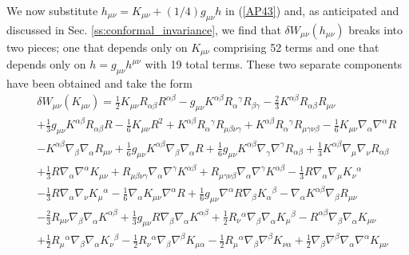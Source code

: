 We now substitute $h_{\mu\nu}=K_{\mu\nu}+(1/4)g_{\mu\nu}h$ in (\ref{AP43}) and, as anticipated and discussed in Sec. \ref{ss:conformal_invariance}, we find that $\delta W_{\mu\nu}(h_{\mu\nu})$ breaks into two pieces; one that depends only on $K_{\mu\nu}$ comprising 52 terms and one that depends only on $h=g_{\mu\nu}h^{\mu\nu}$ with 19 total terms. These two separate components have been obtained and take the form
%
\begin{eqnarray}
&&\delta W_{\mu\nu}(K_{\mu\nu})=\tfrac{1}{2} K_{\mu \nu} R_{\alpha \beta} R^{\alpha \beta} -  g_{\mu \nu} K^{\alpha \beta} R_{\alpha}{}^{\gamma} R_{\beta \gamma} -  \tfrac{2}{3} K^{\alpha \beta} R_{\alpha \beta} R_{\mu \nu} 
\nonumber\\
&&+ \tfrac{1}{3} g_{\mu \nu} K^{\alpha \beta} R_{\alpha \beta} R -  \tfrac{1}{6} K_{\mu \nu} R^2 
+ K^{\alpha \beta} R_{\alpha}{}^{\gamma} R_{\mu \beta \nu \gamma} 
+ K^{\alpha \beta} R_{\alpha}{}^{\gamma} R_{\mu \gamma \nu \beta} -  \tfrac{1}{6} K_{\mu \nu} \nabla_{\alpha}\nabla^{\alpha}R 
\nonumber\\
&&-  K^{\alpha \beta} \nabla_{\beta}\nabla_{\alpha}R_{\mu \nu} + \tfrac{1}{6} g_{\mu \nu} K^{\alpha \beta} \nabla_{\beta}\nabla_{\alpha}R + \tfrac{1}{6} g_{\mu \nu} K^{\alpha \beta} \nabla_{\gamma}\nabla^{\gamma}R_{\alpha \beta} 
+ \tfrac{1}{3} K^{\alpha \beta} \nabla_{\mu}\nabla_{\nu}R_{\alpha \beta}
\nonumber\\
&&
+\tfrac{1}{3} R \nabla_{\alpha}\nabla^{\alpha}K_{\mu \nu} + R_{\mu \beta \nu \gamma} \nabla_{\alpha}\nabla^{\gamma}K^{\alpha \beta} + R_{\mu \gamma \nu \beta} \nabla_{\alpha}\nabla^{\gamma}K^{\alpha \beta} -  \tfrac{1}{3} R \nabla_{\alpha}\nabla_{\mu}K_{\nu}{}^{\alpha} 
\nonumber\\
&&-  \tfrac{1}{3} R \nabla_{\alpha}\nabla_{\nu}K_{\mu}{}^{\alpha} 
-  \tfrac{1}{6} \nabla_{\alpha}K_{\mu \nu} \nabla^{\alpha}R 
+ \tfrac{1}{6} g_{\mu \nu} \nabla^{\alpha}R \nabla_{\beta}K_{\alpha}{}^{\beta} -  \nabla_{\alpha}K^{\alpha \beta} \nabla_{\beta}R_{\mu \nu} 
\nonumber\\
&&-  \tfrac{2}{3} R_{\mu \nu} \nabla_{\beta}\nabla_{\alpha}K^{\alpha \beta} + \tfrac{1}{3} g_{\mu \nu} R \nabla_{\beta}\nabla_{\alpha}K^{\alpha \beta} + \tfrac{1}{2} R_{\nu}{}^{\alpha} \nabla_{\beta}\nabla_{\alpha}K_{\mu}{}^{\beta} 
-  R^{\alpha \beta} \nabla_{\beta}\nabla_{\alpha}K_{\mu \nu} 
\nonumber\\
&&
+ \tfrac{1}{2} R_{\mu}{}^{\alpha} \nabla_{\beta}\nabla_{\alpha}K_{\nu}{}^{\beta} -  \tfrac{1}{2} R_{\nu}{}^{\alpha} \nabla_{\beta}\nabla^{\beta}K_{\mu \alpha} -  \tfrac{1}{2} R_{\mu}{}^{\alpha} \nabla_{\beta}\nabla^{\beta}K_{\nu \alpha} + \tfrac{1}{2} \nabla_{\beta}\nabla^{\beta}\nabla_{\alpha}\nabla^{\alpha}K_{\mu \nu} 

\end{eqnarray}
